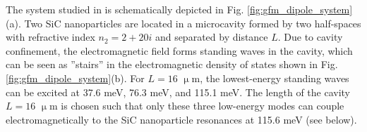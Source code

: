 



The system studied in  is schematically depicted in Fig. \ref{fig:gfm_dipole_system}(a). Two SiC nanoparticles are located in a microcavity formed by two half-spaces with refractive index $n_2=2+20i$ and separated by distance $L$. Due to cavity confinement, the electromagnetic field forms standing waves in the cavity, which can be seen as ''stairs'' in the electromagnetic density of states shown in Fig. \ref{fig:gfm_dipole_system}(b). For $L=16$ $\upmu$m, the lowest-energy standing waves can be excited at 37.6 meV, 76.3 meV, and 115.1 meV. The length of the cavity $L=16$ $\upmu$m is chosen such that only these three low-energy modes can couple electromagnetically to the SiC nanoparticle resonances at 115.6 meV (see below). %

